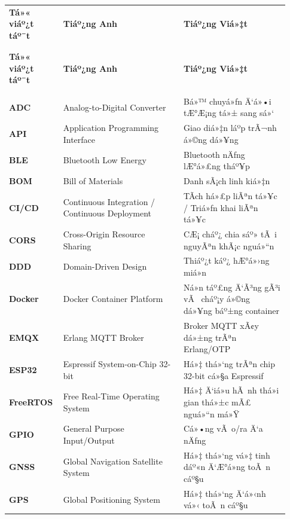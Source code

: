 \documentclass[a4paper]{extarticle}
\newcounter{none} %
\begin{document}
{\def\LTcaptype{none} %
\setlength{\tabcolsep}{4pt}
\begin{longtable}{|L{0.160\linewidth}|L{0.410\linewidth}|L{0.360\linewidth}|}
\\\hline
\textbf{Tá»« viáº¿t táº¯t} & \textbf{Tiáº¿ng Anh} & \textbf{Tiáº¿ng Viá»‡t} \\
\\\hline
\endfirsthead
\\\hline
\textbf{Tá»« viáº¿t táº¯t} & \textbf{Tiáº¿ng Anh} & \textbf{Tiáº¿ng Viá»‡t} \\
\\\hline
\endhead
\\\hline
\endfoot
\endlastfoot
\textbf{ADC} & Analog-to-Digital Converter & Bá»™ chuyá»ƒn Ä‘á»•i tÆ°Æ¡ng tá»± sang
sá»‘ \\\hline
\textbf{API} & Application Programming Interface & Giao diá»‡n láº­p trÃ¬nh
á»©ng dá»¥ng \\\hline
\textbf{BLE} & Bluetooth Low Energy & Bluetooth nÄƒng lÆ°á»£ng tháº¥p \\\hline
\textbf{BOM} & Bill of Materials & Danh sÃ¡ch linh kiá»‡n \\\hline
\textbf{CI/CD} & Continuous Integration / Continuous Deployment & TÃ­ch
há»£p liÃªn tá»¥c / Triá»ƒn khai liÃªn tá»¥c \\\hline
\textbf{CORS} & Cross-Origin Resource Sharing & CÆ¡ cháº¿ chia sáº» tÃ i nguyÃªn
khÃ¡c nguá»“n \\\hline
\textbf{DDD} & Domain-Driven Design & Thiáº¿t káº¿ hÆ°á»›ng miá»n \\\hline
\textbf{Docker} & Docker Container Platform & Ná»n táº£ng Ä‘Ã³ng gÃ³i vÃ  cháº¡y
á»©ng dá»¥ng báº±ng container \\\hline
\textbf{EMQX} & Erlang MQTT Broker & Broker MQTT xÃ¢y dá»±ng trÃªn Erlang/OTP \\\hline
\textbf{ESP32} & Espressif System-on-Chip 32-bit & Há»‡ thá»‘ng trÃªn chip
32-bit cá»§a Espressif \\\hline
\textbf{FreeRTOS} & Free Real-Time Operating System & Há»‡ Ä‘iá»u hÃ nh thá»i
gian thá»±c mÃ£ nguá»“n má»Ÿ \\\hline
\textbf{GPIO} & General Purpose Input/Output & Cá»•ng vÃ o/ra Ä‘a nÄƒng \\\hline
\textbf{GNSS} & Global Navigation Satellite System & Há»‡ thá»‘ng vá»‡ tinh
dáº«n Ä‘Æ°á»ng toÃ n cáº§u \\\hline
\textbf{GPS} & Global Positioning System & Há»‡ thá»‘ng Ä‘á»‹nh vá»‹ toÃ n cáº§u \\\hline

\end{longtable}}
\end{document}
